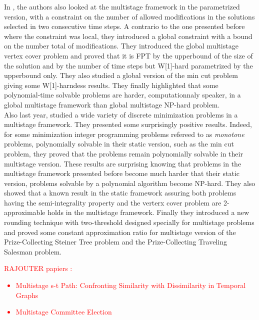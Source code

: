 \documentclass[a4paper]{book}
\newcommand{\alex}[2]{\textcolor{red}{#1}}
\begin{document}
In \cite{heeger2019multistage}, the authors also looked at the multistage framework in the parametrized version, with a constraint on the number of allowed modifications in the solutions selected in two consecutive time steps. A contrario to the one presented before where the constraint was local, they introduced a global constraint with a bound on the number total of modifications. They introduced the {\sc global multistage vertex cover} problem and proved that it is FPT by the upperbound of the size of the solution and by the number of time steps but W[1]-hard parametrized by the upperbound only. They also studied a global version of the {\sc min cut} problem giving some W[1]-harndess results. They finally highlighted that some polynomial-time solvable problems are harder, computationnaly speaker, in a global multistage framework than global multistage NP-hard problem. \\

Also last year, \cite{bampis2019lp} studied a wide variety of discrete minimization problems in a multistage framework. They presented some surprisingly positive results. Indeed, for some minimization integer programming problems refereed to as \textit{monotone} problems, polynomially solvable in their static version, such as the {\sc min cut} problem, they proved that the problems remain polynomially solvable in their multistage version. These results are surprising knowing that problems in the multistage framework presented before become much harder that their static version, problems solvable by a polynomial algorithm become NP-hard. They also showed that a known result in the static framework assuring both problems having the semi-integrality property and the {\sc verterx cover} problem are 2-approximable holds in the multistage framework. Finally they introduced a new rounding technique with two-threshold designed specially for multistage problems and proved some constant approximation ratio for multistage version of the {\sc Prize-Collecting Steiner Tree} problem and the {\sc Prize-Collecting Traveling Salesman} problem. \\

\alex{RAJOUTER papiers :
\begin{itemize}
    \item Multistage s-t Path: Confronting Similarity with Dissimilarity in Temporal Graphs
    \item Multistage Committee Election
\end{itemize}}\\
\end{document}
